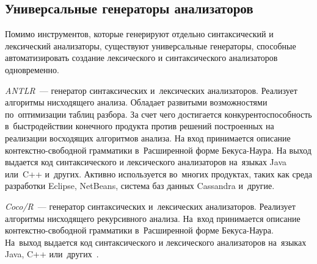 \subsection{Универсальные генераторы анализаторов} \label{sub118}

Помимо инструментов, которые генерируют отдельно синтаксический и лексический анализаторы, существуют универсальные генераторы, способные автоматизировать создание лексического и синтаксического анализаторов одновременно. 

\textit{ANTLR}~--- генератор синтаксических и~лексических анализаторов. Реализует алгоритмы нисходящего анализа. Обладает развитыми возможностями по~оптимизации таблиц разбора. За счет чего достигается конкурентоспособность в~быстродействии конечного продукта против решений построенных на реализации восходящих алгоритмов анализа.
На вход принимается описание контекстно-свободной грамматики в~Расширенной форме Бекуса-Наура. На выход выдается код синтаксического и лексического анализаторов на~языках Java или~C++ и~других. Активно
используется во~многих продуктах, таких как среда разработки Eclipse, NetBeans, система баз данных Cassandra и~другие.

\textit{Coco/R}~--- генератор синтаксических и~лексических анализаторов. Реализует алгоритмы нисходящего рекурсивного анализа. На~вход принимается описание контекстно-свободной грамматики в~Расширенной форме Бекуса-Наура. На~выход выдается код синтаксического и лексического анализаторов на~языках Java, C++ или~других~\cite{dskMag}.